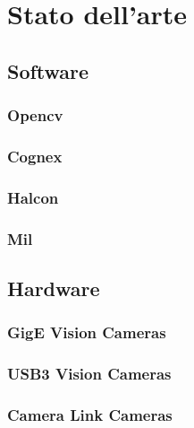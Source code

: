 \chapter{Stato dell'arte}

\section{Software}
\subsection{Opencv}
\subsection{Cognex}
\subsection{Halcon}
\subsection{Mil}

\section{Hardware}
\subsection{GigE Vision Cameras}
\subsection{USB3 Vision Cameras}
\subsection{Camera Link Cameras}